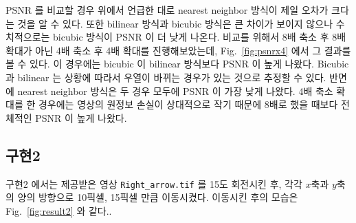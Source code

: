 \documentclass[a4paper, 12p]{paper}
\def\code#1{\texttt{#1}}
\begin{document}
PSNR 를 비교할 경우 위에서 언급한 대로 nearest neighbor 방식이 제일 오차가 크다는 것을 알 수 있다. 또한 bilinear 방식과 bicubic 방식은 큰 차이가 보이지 않으나 수치적으로는 bicubic 방식이 PSNR 이 더 낮게 나온다. 비교를 위해서 8배 축소 후 8배 확대가 아닌 4배 축소 후 4배 확대를 진행해보았는데, Fig.~\ref{fig:psnrx4} 에서 그 결과를 볼 수 있다. 이 경우에는 bicubic 이 bilinear 방식보다 PSNR 이 높게 나왔다. Bicubic 과 bilinear 는 상황에 따라서 우열이 바뀌는 경우가 있는 것으로 추정할 수 있다. 반면에 nearest neighbor 방식은 두 경우 모두에 PSNR 이 가장 낮게 나왔다. 4배 축소 확대를 한 경우에는 영상의 원정보 손실이 상대적으로 작기 때문에 8배로 했을 때보다 전체적인 PSNR 이 높게 나왔다.

\subsection{구현2}
구현2 에서는 제공받은 영상 \code{Right\_arrow.tif} 를 15도 회전시킨 후, 각각 $x$축과 $y$축의 양의 방향으로 10픽셀, 15픽셀 만큼 이동시켰다. 이동시킨 후의 모습은 Fig.~\ref{fig:result2} 와 같다..
\end{document}
